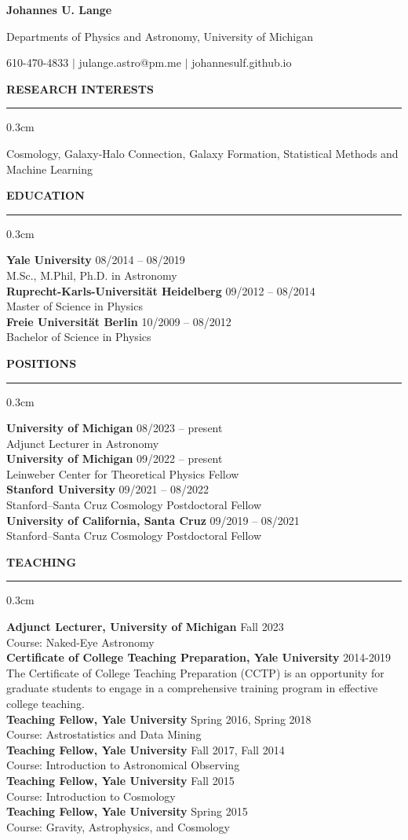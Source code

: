 \documentclass[12pt]{article}
\renewenvironment{section}[1]
  {
  \medskip
  {\color{yaleblue} \MakeUppercase{\bf #1}}
  \smallskip
  \hrule
  \medskip
  \begin{adjustwidth}{0.3cm}{}
  }
  {
  \end{adjustwidth}
  }
\newcommand{\entry}[3]{{\bf #1} \hfill {#2} \\ {#3}}
\begin{document}
\centerline{\color{yaleblue} \Huge \bf Johannes U. Lange}
\centerline{Departments of Physics and Astronomy, University of Michigan}
\centerline{610-470-4833 $\vert$ julange.astro@pm.me $\vert$ johannesulf.github.io}
\bigskip

\begin{section}{Research Interests}
  Cosmology, Galaxy-Halo Connection, Galaxy Formation, Statistical Methods and Machine Learning
\end{section}

\begin{section}{Education}
  \entry{Yale University}{08/2014 -- 08/2019}{M.Sc., M.Phil, Ph.D. in Astronomy} \medskip \\
  \entry{Ruprecht-Karls-Universität Heidelberg}{09/2012 -- 08/2014}{Master of Science in Physics} \medskip \\
  \entry{Freie Universität Berlin}{10/2009 -- 08/2012}{Bachelor of Science in Physics}
\end{section}

\begin{section}{Positions}
  \entry{University of Michigan}{08/2023 -- present}{Adjunct Lecturer in Astronomy} \medskip \\
  \entry{University of Michigan}{09/2022 -- present}{Leinweber Center for Theoretical Physics Fellow} \medskip \\
  \entry{Stanford University}{09/2021 -- 08/2022}{Stanford--Santa Cruz Cosmology Postdoctoral Fellow} \medskip \\
  \entry{University of California, Santa Cruz}{09/2019 -- 08/2021}{Stanford--Santa Cruz Cosmology Postdoctoral Fellow}
\end{section}

\begin{section}{Teaching}
  \entry{Adjunct Lecturer, University of Michigan}{Fall 2023}{Course: Naked-Eye Astronomy} \medskip \\
  \entry{Certificate of College Teaching Preparation, Yale University}{2014-2019}{The Certificate of College Teaching Preparation (CCTP) is an opportunity for graduate students to engage in a comprehensive training program in effective college teaching.} \medskip \\
  \entry{Teaching Fellow, Yale University}{Spring 2016, Spring 2018}{Course: Astrostatistics and Data Mining} \medskip \\
  \entry{Teaching Fellow, Yale University}{Fall 2017, Fall 2014}{Course: Introduction to Astronomical Observing} \medskip \\
  \entry{Teaching Fellow, Yale University}{Fall 2015}{Course: Introduction to Cosmology} \medskip \\
  \entry{Teaching Fellow, Yale University}{Spring 2015}{Course: Gravity, Astrophysics, and Cosmology}
\end{section}
\end{document}
